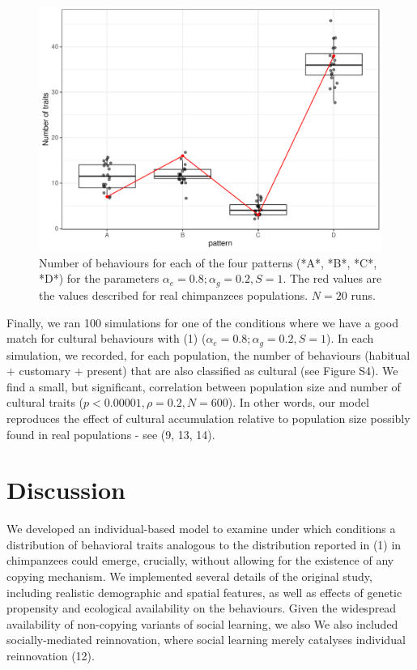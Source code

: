 \documentclass[9pt,twocolumn,twoside,]{pnas-new}
\begin{document}
\begin{figure}[h!]
\begin{center}
\includegraphics[width=11.4cm]{figures/figure_4.pdf}
\caption{Number of behaviours for each of the four patterns (*A*, *B*, *C*, *D*) for the parameters $\alpha_e=0.8;\alpha_g=0.2,S=1$. The red values are the values described for real chimpanzees populations. $N=20$ runs.}
\label{Figure4}
\end{center}
\end{figure}

Finally, we ran 100 simulations for one of the conditions where we have
a good match for cultural behaviours with (1)
(\(\alpha_e=0.8;\alpha_g=0.2, S=1\)). In each simulation, we recorded,
for each population, the number of behaviours (habitual + customary +
present) that are also classified as cultural (see Figure S4). We find a
small, but significant, correlation between population size and number
of cultural traits (\(p<0.00001,\rho=0.2,N=600\)). In other words, our
model reproduces the effect of cultural accumulation relative to
population size possibly found in real populations - see (9, 13, 14).

\section*{Discussion}\label{discussion}

We developed an individual-based model to examine under which conditions
a distribution of behavioral traits analogous to the distribution
reported in (1) in chimpanzees could emerge, crucially, without allowing
for the existence of any copying mechanism. We implemented several
details of the original study, including realistic demographic and
spatial features, as well as effects of genetic propensity and
ecological availability on the behaviours. Given the widespread
availability of non-copying variants of social learning, we also We also
included socially-mediated reinnovation, where social learning merely
catalyses individual reinnovation (12).
\end{document}

